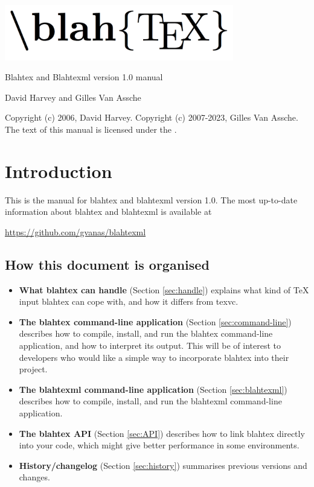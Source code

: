 \documentclass{article}
\newcommand{\blahtexversion}{1.0}
\begin{document}
\thispagestyle{empty}

\begin{center}
\includegraphics[width=10cm]{logo.png}

\vskip 1.6cm

{\Large Blahtex and Blahtexml version \blahtexversion{} manual}

\vskip 0.8cm

{\Large David Harvey} and {\Large Gilles Van Assche}
\end{center}

\vskip 1.6cm

{\footnotesize
Copyright (c) 2006, David Harvey.
Copyright (c) 2007-2023, Gilles Van Assche.
The text of this manual is licensed under the .}

\section{Introduction}

This is the manual for blahtex and blahtexml version \blahtexversion. The most up-to-date information about blahtex and blahtexml is available at
\begin{center}
\url{https://github.com/gvanas/blahtexml}
\end{center}

\subsection{How this document is organised}

\begin{itemize}
\item {\bf What blahtex can handle} (Section \ref{sec:handle}) explains what kind of \TeX{} input blahtex can cope with, and how it differs from texvc.
\item {\bf The blahtex command-line application} (Section \ref{sec:command-line}) describes how to compile, install, and run the blahtex command-line application, and how to interpret its output. This will be of interest to developers who would like a simple way to incorporate blahtex into their project.
\item {\bf The blahtexml command-line application} (Section \ref{sec:blahtexml}) describes how to compile, install, and run the blahtexml command-line application.
\item {\bf The blahtex API} (Section \ref{sec:API}) describes how to link blahtex directly into your code, which might give better performance in some environments.
\item {\bf History/changelog} (Section \ref{sec:history}) summarises previous versions and changes.
\end{itemize}
\end{document}
